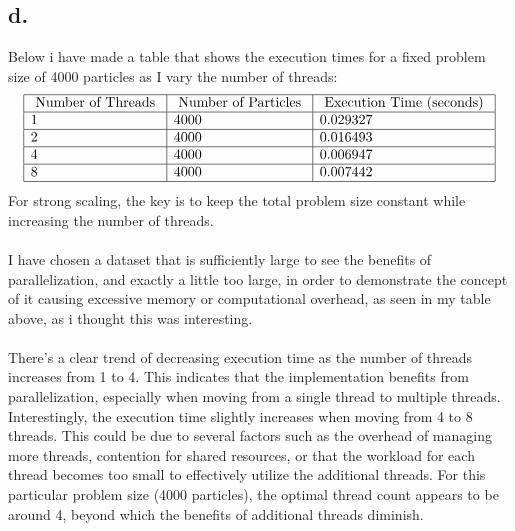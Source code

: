 \documentclass{article}
\begin{document}
\subsection*{d.}
Below i have made a table that shows the execution times for a fixed problem size of 4000 particles as I vary the number of threads:
$$
\begin{array}{|l|l|l|}
\hline \text { Number of Threads } & \text { Number of Particles } & \text { Execution Time (seconds) } \\
\hline 1 & 4000 & 0.029327 \\
\hline 2 & 4000 & 0.016493 \\
\hline 4 & 4000 & 0.006947 \\
\hline 8 & 4000 & 0.007442 \\
\hline
\end{array}
$$
For strong scaling, the key is to keep the total problem size constant while increasing the number of threads. 
\\
\\
I have chosen a dataset that is sufficiently large to see the benefits of parallelization, and exactly a little too large, in order to demonstrate the concept of it causing excessive memory or computational overhead, as seen in my table above, as i thought this was interesting. 
\\
\\
There's a clear trend of decreasing execution time as the number of threads increases from 1 to 4. This indicates that the implementation benefits from parallelization, especially when moving from a single thread to multiple threads.
Interestingly, the execution time slightly increases when moving from 4 to 8 threads. This could be due to several factors such as the overhead of managing more threads, contention for shared resources, or that the workload for each thread becomes too small to effectively utilize the additional threads. For this particular problem size (4000 particles), the optimal thread count appears to be around 4, beyond which the benefits of additional threads diminish.
\end{document}
